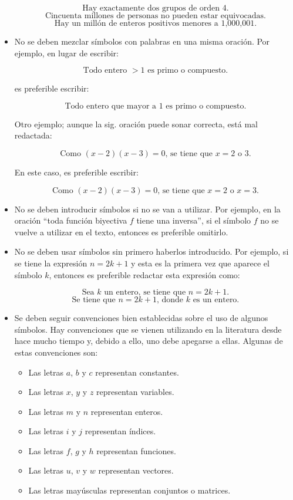 \begin{itemize}
    \[
        \text{Hay exactamente dos grupos de orden 4.}
    \]
    \[
        \text{Cincuenta millones de personas no pueden estar equivocadas.}
    \]
    \[
        \text{Hay un millón de enteros positivos menores a 1,000,001.}
    \]
    
    \item No se deben mezclar símbolos con palabras en una misma oración. Por
    ejemplo, en lugar de escribir:
    
    \[
        \text{Todo entero }>1\text{ es primo o compuesto.}
    \]
    
    es preferible escribir:
    
    \[
        \text{Todo entero que mayor a 1 es primo o compuesto.}
    \]

    Otro ejemplo; aunque la sig. oración puede sonar correcta, está mal
    redactada:
    
    \[
        \text{Como }(x-2)(x-3)=0\text{, se tiene que }x=2\text{ o }3.
    \]
    
    En este caso, es preferible escribir:
    
    \[
        \text{Como }(x-2)(x-3)=0\text{, se tiene que }x=2\text{ o }x=3.
    \]

    \item No se deben introducir símbolos si no se van a utilizar. Por ejemplo,
    en la oración ``toda función biyectiva $f$ tiene una inversa'',
    si el símbolo $f$ no se vuelve a utilizar en el texto, entonces
    es preferible omitirlo. 

    \item No se deben usar símbolos sin primero haberlos introducido. Por ejemplo,
    si se tiene la expresión $n=2k+1$ y esta es la primera vez que aparece
    el símbolo $k$, entonces es preferible redactar esta expresión como:
    
    \[
        \text{Sea }k\text{ un entero, se tiene que }n=2k+1.
    \]
    \[
        \text{Se tiene que }n=2k+1\text{, donde }k\text{ es un entero.}
    \]
    
    \item Se deben seguir convenciones bien establecidas sobre el uso de
    algunos símbolos. Hay convenciones que se vienen utilizando en la
    literatura desde hace mucho tiempo y, debido a ello, uno debe apegarse
    a ellas. Algunas de estas convenciones son:

    \begin{itemize}
        \item Las letras $a$, $b$ y $c$ representan constantes. 
        \item Las letras $x$, $y$ y $z$ representan variables. 
        \item Las letras $m$ y $n$ representan enteros. 
        \item Las letras $i$ y $j$ representan índices.
        \item Las letras $f$, $g$ y $h$ representan funciones. 
        \item Las letras $u$, $v$ y $w$ representan vectores. 
        \item Las letras mayúsculas representan conjuntos o matrices.
    \end{itemize}
    

\end{itemize}
